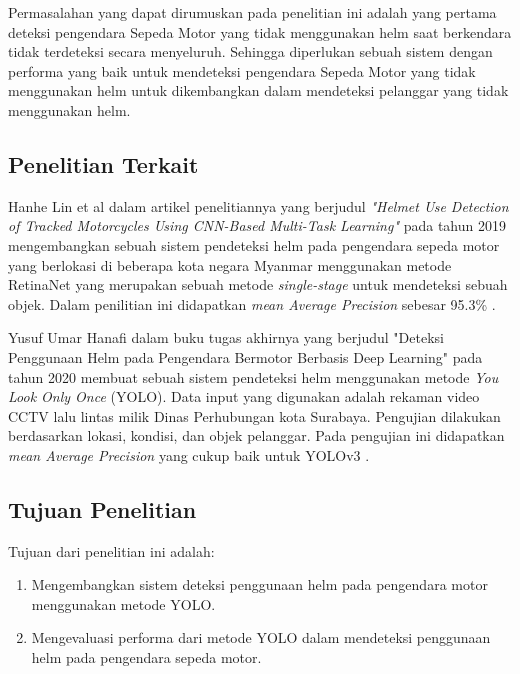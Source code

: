 Permasalahan yang dapat dirumuskan pada penelitian ini adalah yang pertama deteksi pengendara 
Sepeda Motor yang tidak menggunakan helm saat berkendara tidak terdeteksi secara
menyeluruh. Sehingga diperlukan sebuah sistem dengan performa yang baik untuk mendeteksi pengendara
Sepeda Motor yang tidak menggunakan helm untuk dikembangkan dalam mendeteksi
pelanggar yang tidak menggunakan helm.

\subsection{Penelitian Terkait}

Hanhe Lin et al dalam artikel penelitiannya yang berjudul \emph{"Helmet Use Detection of Tracked Motorcycles
Using CNN-Based Multi-Task Learning"} pada tahun 2019 mengembangkan sebuah sistem pendeteksi helm
pada pengendara sepeda motor yang berlokasi di beberapa kota negara Myanmar menggunakan metode RetinaNet yang merupakan
sebuah metode \emph{single-stage} untuk mendeteksi sebuah objek. Dalam penilitian ini didapatkan
\emph{mean Average Precision} sebesar 95.3\% \citep{hanhelin}.

Yusuf Umar Hanafi dalam buku tugas akhirnya yang berjudul "Deteksi Penggunaan Helm pada Pengendara Bermotor Berbasis
Deep Learning" pada tahun 2020 membuat sebuah sistem pendeteksi helm menggunakan metode \emph{You Look Only Once} (YOLO). Data input
yang digunakan adalah rekaman video CCTV lalu lintas milik Dinas Perhubungan kota Surabaya. Pengujian dilakukan berdasarkan lokasi,
kondisi, dan objek pelanggar. Pada pengujian ini didapatkan \emph{mean Average Precision} yang cukup baik untuk YOLOv3 \citep{masYusuf}.


\subsection{Tujuan Penelitian}

Tujuan dari penelitian ini adalah:

\begin{enumerate}[nolistsep]

  \item Mengembangkan sistem deteksi penggunaan helm pada pengendara motor menggunakan metode YOLO.
  \item Mengevaluasi performa dari metode YOLO dalam mendeteksi penggunaan helm pada pengendara sepeda motor.

\end{enumerate}
